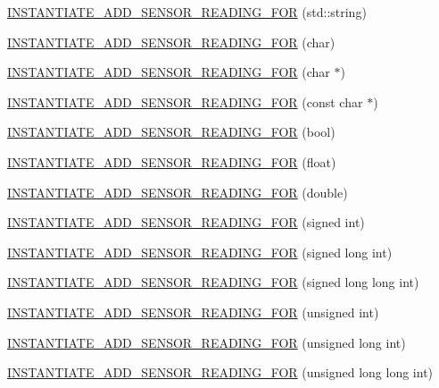 \begin{DoxyCompactItemize}
\item 
\hyperlink{namespacewolkabout_acf58e41de427961a5e7714b79fa10704}{I\+N\+S\+T\+A\+N\+T\+I\+A\+T\+E\+\_\+\+A\+D\+D\+\_\+\+S\+E\+N\+S\+O\+R\+\_\+\+R\+E\+A\+D\+I\+N\+G\+\_\+\+F\+OR} (std\+::string)
\item 
\hyperlink{namespacewolkabout_af191b2fc15ac0af9ac9bfe5f07e7201b}{I\+N\+S\+T\+A\+N\+T\+I\+A\+T\+E\+\_\+\+A\+D\+D\+\_\+\+S\+E\+N\+S\+O\+R\+\_\+\+R\+E\+A\+D\+I\+N\+G\+\_\+\+F\+OR} (char)
\item 
\hyperlink{namespacewolkabout_a118ef4c42d9083afb2b528eb1b69784a}{I\+N\+S\+T\+A\+N\+T\+I\+A\+T\+E\+\_\+\+A\+D\+D\+\_\+\+S\+E\+N\+S\+O\+R\+\_\+\+R\+E\+A\+D\+I\+N\+G\+\_\+\+F\+OR} (char $\ast$)
\item 
\hyperlink{namespacewolkabout_a4a95f33a89ba3c6fc12e0ad84509f0b4}{I\+N\+S\+T\+A\+N\+T\+I\+A\+T\+E\+\_\+\+A\+D\+D\+\_\+\+S\+E\+N\+S\+O\+R\+\_\+\+R\+E\+A\+D\+I\+N\+G\+\_\+\+F\+OR} (const char $\ast$)
\item 
\hyperlink{namespacewolkabout_a919fbd2207fb46701d043e501da5b68a}{I\+N\+S\+T\+A\+N\+T\+I\+A\+T\+E\+\_\+\+A\+D\+D\+\_\+\+S\+E\+N\+S\+O\+R\+\_\+\+R\+E\+A\+D\+I\+N\+G\+\_\+\+F\+OR} (bool)
\item 
\hyperlink{namespacewolkabout_aff83b1d051bc4c1df8c1287b1516f0a4}{I\+N\+S\+T\+A\+N\+T\+I\+A\+T\+E\+\_\+\+A\+D\+D\+\_\+\+S\+E\+N\+S\+O\+R\+\_\+\+R\+E\+A\+D\+I\+N\+G\+\_\+\+F\+OR} (float)
\item 
\hyperlink{namespacewolkabout_acec04aaacd6884a6461566daaedbb8e4}{I\+N\+S\+T\+A\+N\+T\+I\+A\+T\+E\+\_\+\+A\+D\+D\+\_\+\+S\+E\+N\+S\+O\+R\+\_\+\+R\+E\+A\+D\+I\+N\+G\+\_\+\+F\+OR} (double)
\item 
\hyperlink{namespacewolkabout_a256aceb36e95861f1102f0fb25b0fc75}{I\+N\+S\+T\+A\+N\+T\+I\+A\+T\+E\+\_\+\+A\+D\+D\+\_\+\+S\+E\+N\+S\+O\+R\+\_\+\+R\+E\+A\+D\+I\+N\+G\+\_\+\+F\+OR} (signed int)
\item 
\hyperlink{namespacewolkabout_ab65c3e275b87f02c18984c06c7c111a2}{I\+N\+S\+T\+A\+N\+T\+I\+A\+T\+E\+\_\+\+A\+D\+D\+\_\+\+S\+E\+N\+S\+O\+R\+\_\+\+R\+E\+A\+D\+I\+N\+G\+\_\+\+F\+OR} (signed long int)
\item 
\hyperlink{namespacewolkabout_aa64fdafbb11e94d12f9609697e0b6e6f}{I\+N\+S\+T\+A\+N\+T\+I\+A\+T\+E\+\_\+\+A\+D\+D\+\_\+\+S\+E\+N\+S\+O\+R\+\_\+\+R\+E\+A\+D\+I\+N\+G\+\_\+\+F\+OR} (signed long long int)
\item 
\hyperlink{namespacewolkabout_a16ee0f0916e84040e73aa1567faa2633}{I\+N\+S\+T\+A\+N\+T\+I\+A\+T\+E\+\_\+\+A\+D\+D\+\_\+\+S\+E\+N\+S\+O\+R\+\_\+\+R\+E\+A\+D\+I\+N\+G\+\_\+\+F\+OR} (unsigned int)
\item 
\hyperlink{namespacewolkabout_ac9bd46ccf1bf73874b6c6d62f57c1cc0}{I\+N\+S\+T\+A\+N\+T\+I\+A\+T\+E\+\_\+\+A\+D\+D\+\_\+\+S\+E\+N\+S\+O\+R\+\_\+\+R\+E\+A\+D\+I\+N\+G\+\_\+\+F\+OR} (unsigned long int)
\item 
\hyperlink{namespacewolkabout_a4a78eb660a66b9b19493648db27cd773}{I\+N\+S\+T\+A\+N\+T\+I\+A\+T\+E\+\_\+\+A\+D\+D\+\_\+\+S\+E\+N\+S\+O\+R\+\_\+\+R\+E\+A\+D\+I\+N\+G\+\_\+\+F\+OR} (unsigned long long int)
\end{DoxyCompactItemize}


